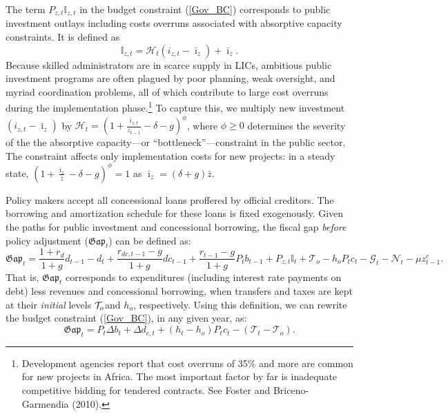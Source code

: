 \documentclass[11pt]{article}
\begin{document}
The term $P_{z,t}\mathbb{I}_{z,t}$ in the budget constraint (\ref{Gov_BC})
corresponds to public investment outlays including costs overruns associated
with absorptive capacity constraints. It is defined as%
\begin{equation*}
\mathbb{I}_{z,t}=\mathcal{H}_{t}(i_{z,t}-\bar{\imath}_{z})+\bar{\imath}_{z}.
\end{equation*}%
Because skilled administrators are in scarce supply in LICs, ambitious
public investment programs are often plagued by poor planning, weak
oversight, and myriad coordination problems, all of which contribute to
large cost overruns during the implementation phase.\footnote{%
Development agencies report that cost overruns of 35\% and more are common
for new projects in Africa. The most important factor by far is inadequate
competitive bidding for tendered contracts. See Foster and Briceno-Garmendia
(2010).} To capture this, we multiply new investment $(i_{z,t}-\bar{\imath}%
_{z})$ by $\mathcal{H}_{t}=\left( 1+\frac{i_{z,t}}{z_{t-1}}-\delta -g\right)
^{\phi }$, where $\phi \geq 0$ determines the severity of the the absorptive
capacity---or \textquotedblleft bottleneck\textquotedblright ---constraint
in the public sector. The constraint affects only implementation costs for
new projects: in a steady state, $\left( 1+\frac{\bar{\imath}_{z}}{\bar{z}}%
-\delta -g\right) ^{\phi }=1$ as $\bar{\imath}_{z}=(\delta +g)\bar{z}$.

Policy makers accept all concessional loans proffered by official creditors.
The borrowing and amortization schedule for these loans is fixed
exogenously. Given the paths for public investment and concessional
borrowing, the fiscal gap \textit{before }policy adjustment ($\mathfrak{Gap}%
_{t}$) can be defined as:%
\begin{equation}
\mathfrak{Gap}_{t}=\frac{1+r_{d}}{1+g}d_{t-1}-d_{t}+\frac{r_{dc,t-1}-g}{1+g}%
dc_{t-1}+\frac{r_{t-1}-g}{1+g}P_{t}b_{t-1}+P_{z,t}\mathbb{I}_{t}+\mathcal{T}%
_{o}-h_{o}P_{t}c_{t}-\mathcal{G}_{t}-\mathcal{N}_{t}-\mu z_{t-1}^{e}.
\label{gapdef}
\end{equation}%
That is, $\mathfrak{Gap}_{t}$ corresponds to expenditures (including
interest rate payments on debt) less revenues and concessional borrowing,
when transfers and taxes are kept at their \textit{initial} levels $\mathcal{%
T}_{o}$and $h_{o}$, respectively. Using this definition, we can rewrite the
budget constraint (\ref{Gov_BC}), in any given year, as: 
\begin{equation}
\mathfrak{Gap}_{t}=P_{t}\Delta b_{t}+\Delta d_{c,t}+(h_{t}-h_{o})P_{t}c_{t}-(%
\mathcal{T}_{t}-\mathcal{T}_{o}).  \label{exgap}
\end{equation}
\end{document}
